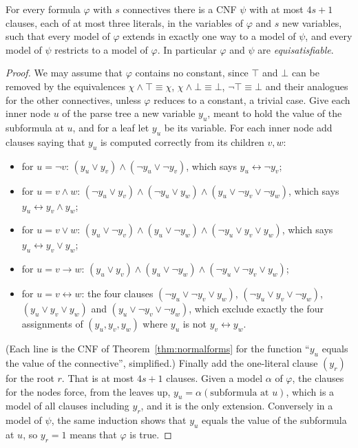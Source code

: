 \begin{theorem}[Tseitin, 1968]\label{thm:tseitin}
For every formula $\varphi$ with $s$ connectives there is a CNF $\psi$ with at most $4s+1$ clauses, each of at most three
literals, in the variables of $\varphi$ and $s$ new variables, such that every model of $\varphi$ extends in exactly one way to a
model of $\psi$, and every model of $\psi$ restricts to a model of $\varphi$. In particular $\varphi$ and $\psi$ are \emph{equisatisfiable}.
\end{theorem}
\begin{proof}
We may assume that $\varphi$ contains no constant, since $\top$ and $\bot$ can be removed by the equivalences $\chi\land\top\equiv\chi$,
$\chi\land\bot\equiv\bot$, $\neg\top\equiv\bot$ and their analogues for the other connectives, unless $\varphi$ reduces to a constant, a trivial case.
Give each inner node $u$ of the parse tree a new variable $y_u$, meant to hold the value of the subformula at $u$, and for a
leaf let $y_u$ be its variable. For each inner node add clauses saying that $y_u$ is computed correctly from its children
$v,w$:
\begin{itemize}
\item for $u=\neg v$: $(y_u\lor y_v)\land(\neg y_u\lor\neg y_v)$, which says $y_u\leftrightarrow\neg y_v$;
\item for $u=v\land w$: $(\neg y_u\lor y_v)\land(\neg y_u\lor y_w)\land(y_u\lor\neg y_v\lor\neg y_w)$, which says $y_u\leftrightarrow y_v\land y_w$;
\item for $u=v\lor w$: $(y_u\lor\neg y_v)\land(y_u\lor\neg y_w)\land(\neg y_u\lor y_v\lor y_w)$, which says $y_u\leftrightarrow y_v\lor y_w$;
\item for $u=v\to w$: $(y_u\lor y_v)\land(y_u\lor\neg y_w)\land(\neg y_u\lor\neg y_v\lor y_w)$;
\item for $u=v\leftrightarrow w$: the four clauses $(\neg y_u\lor\neg y_v\lor y_w)$, $(\neg y_u\lor y_v\lor\neg y_w)$, $(y_u\lor y_v\lor y_w)$ and
$(y_u\lor\neg y_v\lor\neg y_w)$, which exclude exactly the four assignments of $(y_u,y_v,y_w)$ where $y_u$ is not $y_v\leftrightarrow y_w$.
\end{itemize}
(Each line is the CNF of Theorem~\ref{thm:normalforms} for the function ``$y_u$ equals the value of the connective'', simplified.)
Finally add the one-literal clause $(y_r)$ for the root $r$. That is at most $4s+1$ clauses. Given a model $\alpha$ of $\varphi$, the
clauses for the nodes force, from the leaves up, $y_u=\alpha(\text{subformula at }u)$, which is a model of all clauses including
$y_r$, and it is the only extension. Conversely in a model of $\psi$, the same induction shows that $y_u$ equals the value of
the subformula at $u$, so $y_r=1$ means that $\varphi$ is true.
\end{proof}

